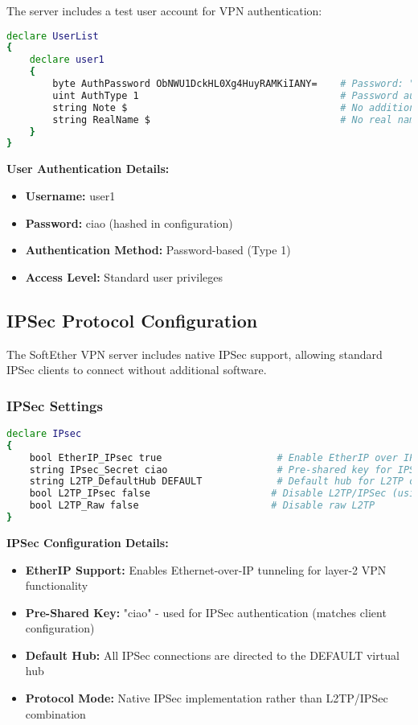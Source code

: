 The server includes a test user account for VPN authentication:

\begin{lstlisting}[language=bash]
declare UserList
{
    declare user1
    {
        byte AuthPassword ObNWU1DckHL0Xg4HuyRAMKiIANY=    # Password: "ciao"
        uint AuthType 1                                   # Password authentication
        string Note $                                     # No additional notes
        string RealName $                                 # No real name specified
    }
}
\end{lstlisting}

\textbf{User Authentication Details:}
\begin{itemize}
    \item \textbf{Username:} user1
    \item \textbf{Password:} ciao (hashed in configuration)
    \item \textbf{Authentication Method:} Password-based (Type 1)
    \item \textbf{Access Level:} Standard user privileges
\end{itemize}

\subsection{IPSec Protocol Configuration}

The SoftEther VPN server includes native IPSec support, allowing standard IPSec clients to connect without additional software.

\subsubsection{IPSec Settings}

\begin{lstlisting}[language=bash]
declare IPsec
{
    bool EtherIP_IPsec true                    # Enable EtherIP over IPSec
    string IPsec_Secret ciao                   # Pre-shared key for IPSec
    string L2TP_DefaultHub DEFAULT             # Default hub for L2TP connections
    bool L2TP_IPsec false                     # Disable L2TP/IPSec (using native IPSec)
    bool L2TP_Raw false                       # Disable raw L2TP
}
\end{lstlisting}

\textbf{IPSec Configuration Details:}

\begin{itemize}
    \item \textbf{EtherIP Support:} Enables Ethernet-over-IP tunneling for layer-2 VPN functionality
    \item \textbf{Pre-Shared Key:} "ciao" - used for IPSec authentication (matches client configuration)
    \item \textbf{Default Hub:} All IPSec connections are directed to the DEFAULT virtual hub
    \item \textbf{Protocol Mode:} Native IPSec implementation rather than L2TP/IPSec combination
\end{itemize}


